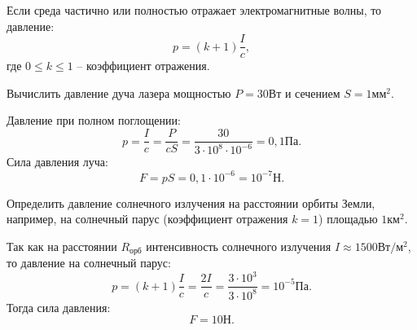 	Если среда частично или полностью отражает электромагнитные волны, то 
    давление:
	\[
        p = (k + 1)\frac{I}{c},
    \]
	где \( 0 \leq k \leq 1 \) -- коэффициент отражения.
	
	\begin{example}
        Вычислить давление дуча лазера мощностью \( P = 30 \)Вт и сечением
        \( S = 1\text{мм}^2 \).
	\end{example}
	\begin{solution}
        Давление при полном поглощении:
        \[
            p = \frac{I}{c} = \frac{P}{cS} =
            \frac{30}{3\cdot10^8\cdot10^{-6}} = 0,1\text{Па}.
        \]
        Сила давления луча:
        \[
            F = pS = 0,1\cdot10^{-6} = 10^{-7}\text{Н}.
        \]
	\end{solution}
	
	\begin{example}
        Определить давление солнечного излучения на расстоянии орбиты Земли,
        например, на солнечный парус (коэффициент отражения \( k = 1 \))
        площадью \( 1 \text{км}^2 \).
	\end{example}
	\begin{solution}
        Так как на расстоянии \( R_\textit{орб} \) интенсивность солнечного
        излучения \( I \approx 1500 \text{Вт}/\text{м}^2 \), то давление на
        солнечный парус:
        \[
            p = (k + 1)\frac{I}{c} = \frac{2I}{c} =
            \frac{3\cdot10^3}{3\cdot10^8} = 10^{-5}\text{Па}.
        \]
        Тогда сила давления:
        \[
            F = 10\text{Н}.
        \]
	\end{solution}
